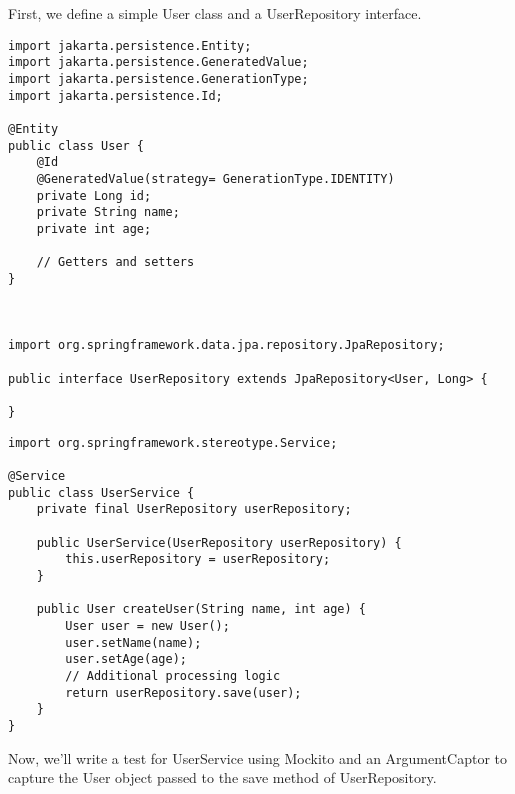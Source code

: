 First, we define a simple User class and a UserRepository interface.

\begin{lstlisting}
import jakarta.persistence.Entity;
import jakarta.persistence.GeneratedValue;
import jakarta.persistence.GenerationType;
import jakarta.persistence.Id;

@Entity
public class User {
	@Id
	@GeneratedValue(strategy= GenerationType.IDENTITY)
	private Long id;
    private String name;
    private int age;

    // Getters and setters
}



import org.springframework.data.jpa.repository.JpaRepository;

public interface UserRepository extends JpaRepository<User, Long> {

}
\end{lstlisting}


\begin{lstlisting}
import org.springframework.stereotype.Service;

@Service
public class UserService {
    private final UserRepository userRepository;

    public UserService(UserRepository userRepository) {
        this.userRepository = userRepository;
    }

    public User createUser(String name, int age) {
        User user = new User();
        user.setName(name);
        user.setAge(age);
        // Additional processing logic
        return userRepository.save(user);
    }
}
\end{lstlisting}

Now, we'll write a test for UserService using Mockito and an ArgumentCaptor to capture the User object passed to the save method of UserRepository.

